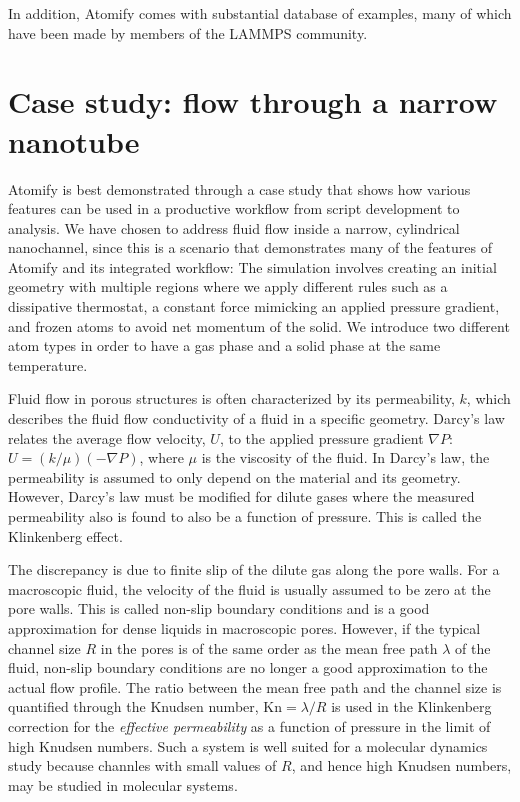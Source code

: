 \documentclass[12pt,a4paper,final]{iopart}
\begin{document}
In addition, Atomify comes with substantial database of examples,
many of which have been made by members of the LAMMPS community.

\section{\label{sec:casestudy}Case study: flow through a narrow nanotube}
Atomify is best demonstrated through a case study that shows how 
various features can be used in a productive workflow from script development to analysis.
We have chosen to address fluid flow inside a narrow, cylindrical nanochannel, since this is a scenario that demonstrates many of the features of Atomify and its integrated workflow: The simulation involves creating an initial geometry with multiple regions 
where we apply different rules such as a dissipative thermostat, a constant force mimicking
an applied pressure gradient, and frozen atoms to avoid net momentum of the solid.
We introduce two different atom types in order to have a gas phase and a solid phase at the same temperature.

Fluid flow in porous structures is often characterized by its permeability, $k$, which describes the fluid flow conductivity of a fluid in a specific geometry. Darcy's law relates the average flow velocity, $U$, to the applied pressure gradient $\nabla P$: $U = (k/\mu)(-\nabla P)$, where $\mu$ is the viscosity of the fluid. In Darcy's law, the permeability is assumed to only depend on the material and its geometry. 
However, Darcy's law must be modified for dilute
gases where the measured permeability also is found to also be a function of pressure.
This is called the Klinkenberg effect\cite{klinkenberg1941permeability}.

The discrepancy is due to finite slip of the dilute gas along the pore walls. For a macroscopic fluid, the velocity of the fluid is usually assumed to be zero at the pore walls. This is called non-slip boundary conditions and is a good approximation for dense liquids in macroscopic pores. However, if the typical channel size $R$ in the pores is of the same order as the mean free path $\lambda$ of the fluid, non-slip boundary conditions are no longer a good approximation to the actual flow profile. The ratio between the mean free path and the channel size is quantified through
the Knudsen number, $\text{Kn} = \lambda / R$ is used in the Klinkenberg correction\cite{klinkenberg1941permeability} for the \textit{effective permeability} as a function of pressure in the limit of high Knudsen numbers. Such a system is well suited for a molecular dynamics study because channles with small values of $R$, and hence high Knudsen numbers, may be studied in molecular systems.
\end{document}
